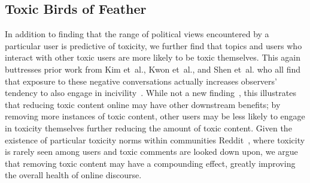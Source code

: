 



\subsection{Toxic Birds of Feather}
In addition to finding that the range of political views encountered by a particular user is predictive of toxicity, we further find that topics and users who interact with other toxic users are more likely to be toxic themselves. This again buttresses prior work from Kim {et~al.}, Kwon {et~al.}, and Shen {et~al.}  who all find that exposure to these negative conversations actually increases observers' tendency to also engage in incivility~\cite{kim2019incivility,kwon2017offensive,shen2020viral}. While not a new finding~\cite{kumar2023understanding}, this illustrates that reducing toxic content online may have other downstream benefits; by removing more instances of toxic content, other users may be less likely to engage in toxicity themselves further reducing the amount of toxic content. Given the existence of particular toxicity norms within communities Reddit~\cite{rajadesingan2020quick}, where toxicity is rarely seen among users and toxic comments are looked down upon, we argue that removing toxic content may have a compounding effect, greatly improving the overall health of online discourse.





